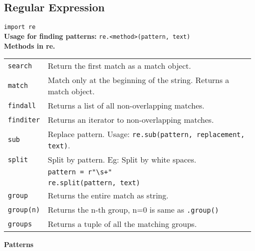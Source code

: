 \subsection*{Regular Expression}

\texttt{import re}\\
\textbf{Usage for finding patterns:} \texttt{re.<method>(pattern, text)}\\

\textbf{Methods in re.}\\
\begin{tabularx}{\linewidth}{lX}
    \texttt{search}         & Return the first match as a match object.\\
    \texttt{match}          & Match only at the beginning of the string. Returns a match object.\\
    \texttt{findall}        & Returns a list of all non-overlapping matches.\\
    \texttt{finditer}       & Returns an iterator to non-overlapping matches.\\
    \texttt{sub}            & Replace pattern. Usage: \texttt{re.sub(pattern, replacement, text)}.\\
    \texttt{split}          & Split by pattern. Eg: Split by white spaces.\\
                            & \texttt{pattern = r"\textbackslash s+"}\\
                            & \texttt{re.split(pattern, text)}\\
    \texttt{group}          & Returns the entire match as string.\\
    \texttt{group(n)}       & Returns the n-th group, n=0 is same as \texttt{.group()}\\
    \texttt{groups}         & Returns a tuple of all the matching groups.\\
\end{tabularx}

\textbf{Patterns}

